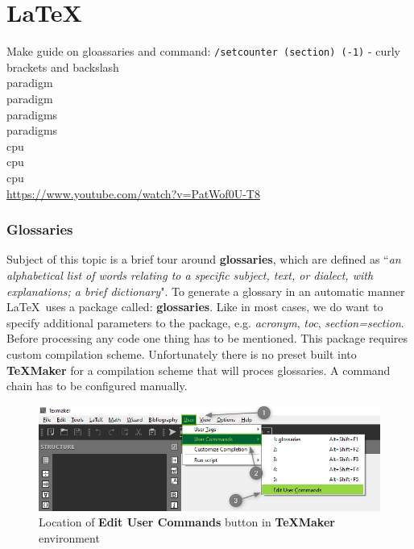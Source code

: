 \part{\LaTeX}

Make guide on gloassaries and command:  \texttt{/setcounter (section) (-1)} - curly brackets and backslash\\
\Gls{paradigm}\\
\gls{paradigm}\\
\Glspl{paradigm}\\
\glspl{paradigm}\\
\acrshort{cpu}\\
\acrlong{cpu}\\
\acrfull{cpu}\\
\url{https://www.youtube.com/watch?v=PatWof0U-T8}

\section{Glossaries}

Subject of this topic is a brief tour around \textbf{glossaries}, which are defined as ``\textit{an alphabetical list of words relating to a specific subject, text, or dialect, with explanations; a brief dictionary}". To generate a glossary in an automatic manner \LaTeX\ uses a package called: \textbf{glossaries}. Like in most cases, we do want to specify additional parameters to the package, e.g. \textit{acronym}, \textit{toc}, \textit{section=section}.\\

Before processing any code one thing has to be mentioned. This package requires custom compilation scheme. Unfortunately there is no preset built into \textbf{TeXMaker} for a compilation scheme that will proces glossaries. A command chain has to be configured manually.

\begin{figure}[H]
\centering
\includegraphics[scale=0.6]{LaTeX/figures/user_command_glossaries_marked.png}
\caption{Location of \textbf{Edit User Commands} button in \textbf{TeXMaker} environment}
\end{figure}

